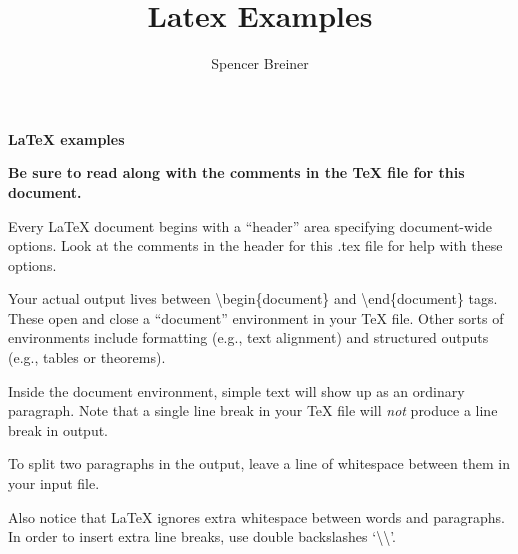 \documentclass[letterpaper,10pt]{article}
\title{Latex Examples}
\author{Spencer Breiner}
\newcommand{\<}{\langle}
\renewcommand{\>}{\rangle}
\newcommand{\bsl}{\textbackslash}
\begin{document}

\begin{center}
\LARGE\textbf{LaTeX examples}\normalsize


\textbf{Be sure to read along with the comments in the \TeX{} file for this document.}
\end{center}

Every \LaTeX{} document begins with a ``header'' area specifying document-wide options. Look at the comments in the header for this .tex file for help with these options.

Your actual output lives between \bsl begin\{document\} and \bsl end\{document\} tags. These open and close a ``document'' environment in your \TeX{} file. Other sorts of environments include formatting (e.g., text alignment) and structured outputs (e.g., tables or theorems).

Inside the document environment, simple text will show up as an ordinary paragraph.
Note that a single line break in your \TeX{} file will \emph{not} produce a line break in output.

To split two paragraphs in the output, leave a line of whitespace between them in your input file.





Also notice             that                     \LaTeX{} ignores extra whitespace between words and paragraphs. In order to insert extra line breaks, use double backslashes `\bsl\bsl'.
\\ \\

\end{document}
